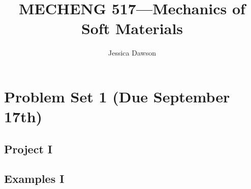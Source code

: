 \documentclass[preprint,12pt,authoryear]{elsarticle}
\begin{document}
\begin{frontmatter}

\title{MECHENG 517---Mechanics of Soft Materials} %

\author{Jessica Dawson} 









\end{frontmatter}


\section*{Problem Set 1 (Due September 17th)}
\subsection*{Project I}

\subsection*{Examples I}
\end{document}
